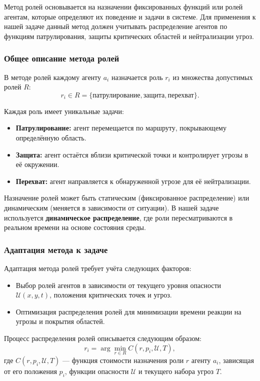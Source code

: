 Метод ролей основывается на назначении фиксированных функций или ролей агентам, которые определяют их поведение и задачи в системе.
Для применения к нашей задаче данный метод должен учитывать распределение агентов по функциям патрулирования, защиты критических областей и нейтрализации угроз.

\subsubsection*{Общее описание метода ролей}
В методе ролей каждому агенту $a_i$ назначается роль $r_i$ из множества допустимых ролей $R$:
\begin{equation}
	r_i \in R = \{\text{патрулирование}, \text{защита}, \text{перехват}\}.
\end{equation}

Каждая роль имеет уникальные задачи:
\begin{itemize}
	\item \textbf{Патрулирование:} агент перемещается по маршруту, покрывающему определённую область.
	\item \textbf{Защита:} агент остаётся вблизи критической точки и контролирует угрозы в её окружении.
	\item \textbf{Перехват:} агент направляется к обнаруженной угрозе для её нейтрализации.
\end{itemize}

Назначение ролей может быть статическим (фиксированное распределение) или динамическим (меняется в зависимости от ситуации).
В нашей задаче используется \textbf{динамическое распределение}, где роли пересматриваются в реальном времени на основе состояния среды.

\subsubsection*{Адаптация метода к задаче}
Адаптация метода ролей требует учёта следующих факторов:
\begin{itemize}
	\item Выбор ролей агентов в зависимости от текущего уровня опасности $\mathcal{U}(x, y, t)$, положения критических точек и угроз.
	\item Оптимизация распределения ролей для минимизации времени реакции на угрозы и покрытия областей.
\end{itemize}

Процесс распределения ролей описывается следующим образом:
\begin{equation}
	r_i = \arg \min_{r \in R} C(r, p_i, \mathcal{U}, T),
	\label{eq:role_assignment}
\end{equation}
где $C(r, p_i, \mathcal{U}, T)$ — функция стоимости назначения роли $r$ агенту $a_i$, зависящая от его положения $p_i$, функции опасности $\mathcal{U}$ и текущего набора угроз $T$.

